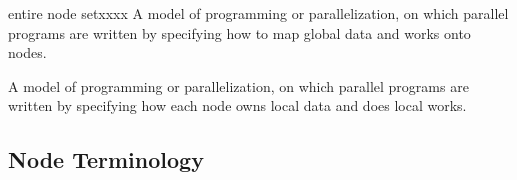 \begin{namelist}{entire node setxxxx}
 A model of programming or parallelization, on which parallel programs
 are written by specifying how to map global data and works onto nodes.


 A model of programming or parallelization, on which parallel programs
 are written by specifying how each node owns local data and does local
 works.


%

\end{namelist}


\subsection{Node Terminology}

